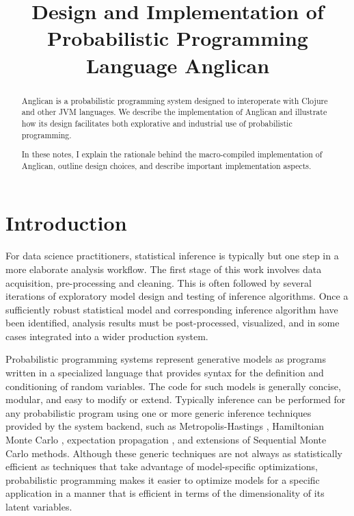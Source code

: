 \documentclass[preprint]{sigplanconf}
\title{Design and Implementation of Probabilistic Programming Language Anglican}
\begin{document}
\maketitle

\begin{abstract}
    Anglican is a probabilistic programming system designed to interoperate
    with Clojure and other JVM languages. We describe the implementation of
    Anglican and illustrate how its design facilitates both explorative and
    industrial use of probabilistic programming.

    In these notes, I explain the rationale behind the
    macro-compiled implementation of Anglican, outline
    design choices, and describe important implementation
    aspects.
\end{abstract}

\section{Introduction}
For data science practitioners, statistical inference is typically
but one step in a more elaborate analysis workflow. The first stage
of this work involves data acquisition, pre-processing and cleaning.
This is often followed by several iterations of exploratory model
design and testing of inference algorithms. Once a sufficiently
robust statistical model and corresponding inference algorithm have
been identified, analysis results must be post-processed, visualized,
and in some cases integrated into a wider production system.

Probabilistic programming systems \cite{GMR+08,MSP14,WVM14,GS15}
represent generative models as programs written in a specialized
language that provides syntax for the definition and conditioning of
random variables. The code for such models is generally concise,
modular, and easy to modify or extend. Typically inference can be
performed for any probabilistic program using one or more generic
inference techniques provided by the system backend, such as
Metropolis-Hastings \cite{WSG11,MSP14,YHG14}, Hamiltonian Monte Carlo
\cite{SDT04}, expectation propagation \cite{MWG+10}, and extensions
of Sequential Monte Carlo \cite{WVM14,MYM+15,PWD+14} methods.
Although these generic techniques are not always as statistically
efficient as techniques that take advantage of model-specific
optimizations, probabilistic programming makes it easier to optimize
models for a specific application in a manner that is efficient in
terms of the dimensionality of its latent variables.
\end{document}
